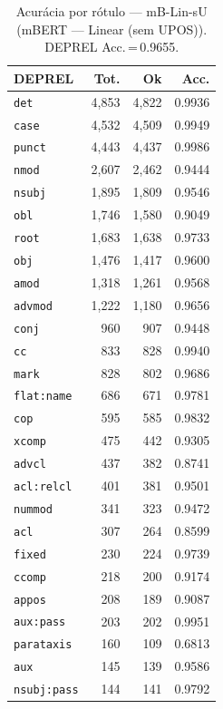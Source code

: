 \begin{table}[ht]
\centering
\caption{Acurácia por rótulo --- mB-Lin-sU (mBERT — Linear (sem UPOS)). DEPREL Acc.\,=\,0.9655.}
\label{tab:acc-predict-test-ablacao-linear-google-bert-bert-base-multilingual-cased}
\scriptsize
\begin{tabular}{lrrr}
\toprule
\textbf{DEPREL} & \textbf{Tot.} & \textbf{Ok} & \textbf{Acc.} \\
\midrule
\texttt{det} & 4,853 & 4,822 & 0.9936 \\
\texttt{case} & 4,532 & 4,509 & 0.9949 \\
\texttt{punct} & 4,443 & 4,437 & 0.9986 \\
\texttt{nmod} & 2,607 & 2,462 & 0.9444 \\
\texttt{nsubj} & 1,895 & 1,809 & 0.9546 \\
\texttt{obl} & 1,746 & 1,580 & 0.9049 \\
\texttt{root} & 1,683 & 1,638 & 0.9733 \\
\texttt{obj} & 1,476 & 1,417 & 0.9600 \\
\texttt{amod} & 1,318 & 1,261 & 0.9568 \\
\texttt{advmod} & 1,222 & 1,180 & 0.9656 \\
\texttt{conj} & 960 & 907 & 0.9448 \\
\texttt{cc} & 833 & 828 & 0.9940 \\
\texttt{mark} & 828 & 802 & 0.9686 \\
\texttt{flat\!:\!name} & 686 & 671 & 0.9781 \\
\texttt{cop} & 595 & 585 & 0.9832 \\
\texttt{xcomp} & 475 & 442 & 0.9305 \\
\texttt{advcl} & 437 & 382 & 0.8741 \\
\texttt{acl\!:\!relcl} & 401 & 381 & 0.9501 \\
\texttt{nummod} & 341 & 323 & 0.9472 \\
\texttt{acl} & 307 & 264 & 0.8599 \\
\texttt{fixed} & 230 & 224 & 0.9739 \\
\texttt{ccomp} & 218 & 200 & 0.9174 \\
\texttt{appos} & 208 & 189 & 0.9087 \\
\texttt{aux\!:\!pass} & 203 & 202 & 0.9951 \\
\texttt{parataxis} & 160 & 109 & 0.6813 \\
\texttt{aux} & 145 & 139 & 0.9586 \\
\texttt{nsubj\!:\!pass} & 144 & 141 & 0.9792 \\

\end{tabular}
\end{table}
